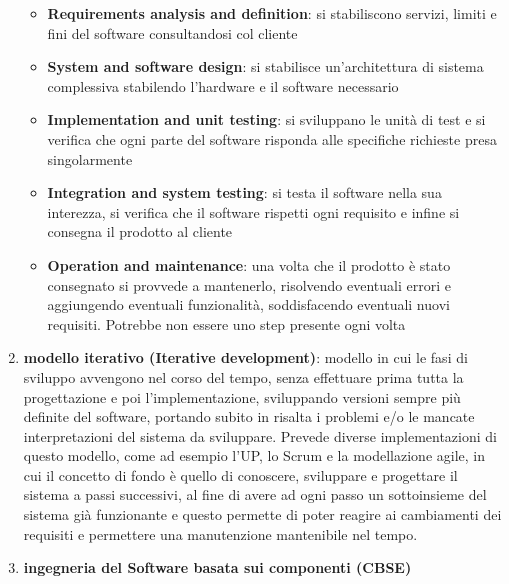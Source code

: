\documentclass[a4paper,12pt, oneside]{book}
\begin{document}
\begin{enumerate}
\begin{itemize}
        	\item \textbf{Requirements analysis and definition}: si stabiliscono servizi, limiti e fini del software consultandosi col cliente
        	\item \textbf{System and software design}: si stabilisce un'architettura di sistema complessiva stabilendo l'hardware e il software necessario
        	\item \textbf{Implementation and unit testing}: si sviluppano le unità di test e si verifica che ogni parte del software risponda alle specifiche richieste presa singolarmente
        	\item \textbf{Integration and system testing}: si testa il software nella sua interezza, si verifica che il software rispetti ogni requisito e infine si consegna il prodotto al cliente
        	\item \textbf{Operation and maintenance}: una volta che il prodotto è stato consegnato si provvede a mantenerlo, risolvendo eventuali errori e aggiungendo eventuali funzionalità, soddisfacendo eventuali nuovi requisiti. Potrebbe non essere uno step presente ogni volta
        \end{itemize}
    \item \textbf{modello iterativo (Iterative development)}: modello in cui le fasi di sviluppo avvengono
        nel corso del tempo, senza effettuare prima tutta la progettazione e poi l'implementazione, 
        sviluppando versioni sempre più definite del software, portando subito in risalta i problemi 
        e/o le mancate interpretazioni del sistema da sviluppare.\newline
        Prevede diverse implementazioni di questo modello, come ad esempio l'UP, lo Scrum e la modellazione
        agile, in cui il concetto di fondo è quello di conoscere, sviluppare e progettare il sistema a passi
        successivi, al fine di avere ad ogni passo un sottoinsieme del sistema già funzionante e questo
        permette di poter reagire ai cambiamenti dei requisiti e permettere una manutenzione
        mantenibile nel tempo.
    \item \textbf{ingegneria del Software basata sui componenti (CBSE)}
\end{enumerate}
\newpage
\end{document}
